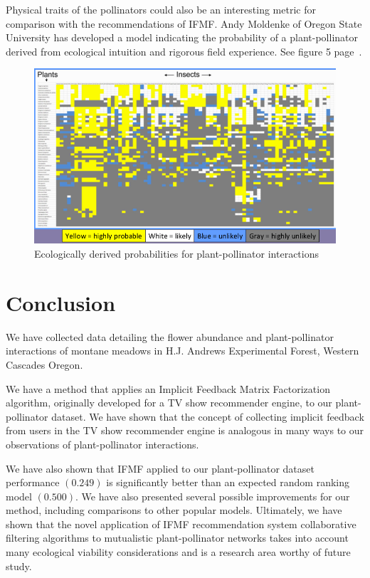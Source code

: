 \documentclass[twocolumn]{article}
\begin{document}
Physical traits of the pollinators could also be an interesting metric
for comparison with the recommendations of IFMF. Andy Moldenke of Oregon 
State University has developed a model indicating the probability of 
a plant-pollinator derived from ecological intuition and rigorous field
experience. See figure 5 page~\pageref{aMx}\cite{moldenke2014pollination}.
\begin{figure}
  \label{aMx}
  \caption{Ecologically derived probabilities for plant-pollinator interactions}
  \centering
  \includegraphics[scale=0.25]{AndyMx.png}
\end{figure}

\section{Conclusion}
We have collected data detailing the flower abundance and 
plant-pollinator interactions of montane meadows in H.J. Andrews 
Experimental Forest, Western Cascades Oregon.

We have a method that applies an Implicit Feedback
Matrix Factorization algorithm, originally developed for a TV show 
recommender engine, to our plant-pollinator dataset. We have shown that
the concept of collecting implicit feedback from users in the TV show 
recommender engine is analogous in many ways to our observations 
of plant-pollinator interactions.

We have also shown that IFMF applied to our plant-pollinator dataset
performance $(0.249)$ is significantly better than an expected 
random ranking model $(0.500)$. We have also presented several possible
improvements for our method, including comparisons to other popular
models. Ultimately, we have shown that the 
novel application of IFMF recommendation system collaborative filtering
algorithms to mutualistic plant-pollinator networks takes into account
many ecological viability considerations and is a research area worthy of future study.
\end{document}
